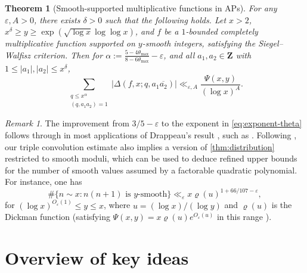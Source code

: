 \documentclass[reqno,11pt]{amsart}
\newtheorem{theorem}{Theorem}[section]
\theoremstyle{definition}
\theoremstyle{remark}
\newtheorem*{remark}{Remark}
\numberwithin{equation}{section}
\newcommand{\Z}{\mathbf{Z}}
\newcommand{\eps}{\varepsilon}
\renewcommand{\bar}{\overline}
\begin{document}
\begin{theorem}[Smooth-supported multiplicative functions in APs] \label{thm:distribution-functions}
For any $\eps, A > 0$, there exists $\delta > 0$ such that the following holds. 
Let $x > 2$, $x^\delta \ge y \ge \exp(\sqrt{\log x} \log \log x)$, and $f$ be a $1$-bounded completely multiplicative function supported on $y$-smooth integers, satisfying the Siegel--Walfisz criterion. Then for $\alpha := \frac{5-4\theta_{\max}}{8-6\theta_{\max}} - \eps$, and all $a_1, a_2 \in \Z$ with $1 \le |a_1|, |a_2| \le x^{\delta}$,
\[
    \sum_{\substack{q \le x^{\alpha} \\ (q, a_1a_2) = 1}} |\Delta(f, x; q, a_1 \bar{a_2})|
    \ll_{\eps,A} 
    \frac{\Psi(x, y)}{(\log x)^A}.
\]
\end{theorem}

\begin{remark}
The improvement from $3/5-\eps$ to the exponent in \cref{eq:exponent-theta} follows through in most applications of Drappeau's result \cite[Th\'eor\`eme 1]{drappeau2015theoremes}, such as \cite[Corollaire 1]{drappeau2015theoremes}. Following \cite{de2020niveau}, our triple convolution estimate also implies a version of \cref{thm:distribution} restricted to smooth moduli, which can be used to deduce refined upper bounds for the number of smooth values assumed by a factorable quadratic polynomial. For instance, one has
\[
    \#\{n \sim x : n(n+1) \text{ is $y$-smooth} \} \ll_\eps 
    x \varrho(u)^{1+66/107-\eps},
\]
for $(\log x)^{O_\eps(1)} \le y \le x$,
where $u = (\log x)/(\log y)$ and $\varrho(u)$ is the Dickman function (satisfying $\Psi(x, y) = x \varrho(u) e^{O_\eps(u)}$ in this range \cite{de2020niveau,hildebrand1986number}).
\end{remark}



\section{Overview of key ideas} \label{sec:overview}
\end{document}
